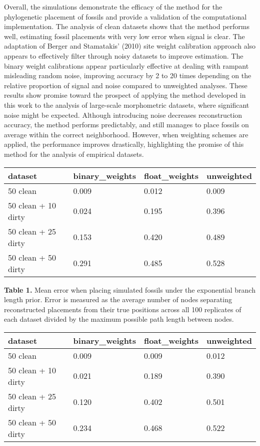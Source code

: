 \documentclass[12pt]{article}
\begin{document}
Overall, the simulations demonstrate the efficacy of the method for the
phylogenetic placement of fossils and provide a validation of the
computational implementation. The analysis of clean datasets shows that
the method performs well, estimating fossil placements with very low
error when signal is clear. The adaptation of Berger and Stamatakis'
(2010) site weight calibration approach also appears to effectively
filter through noisy datasets to improve estimation. The binary weight
calibrations appear particularly effective at dealing with rampant
misleading random noise, improving accuracy by 2 to 20 times
depending on the relative proportion of signal and noise compared to
unweighted analyses. These results show promise toward the prospect of
applying the method developed in this work to the analysis of
large-scale morphometric datasets, where significant noise might be
expected. Although introducing noise decreases
reconstruction accuracy, the method performs predictably, and still
manages to place fossils on average within the correct neighborhood.
However, when weighting schemes are applied, the performance improves
drastically, highlighting the promise of this method for the analysis of
empirical datasets.

\begin{longtable}[]{@{}llll@{}}
\toprule
dataset & binary\_weights & float\_weights & unweighted\tabularnewline
\midrule
\endhead
50 clean & 0.009 & 0.012  & 0.009 \tabularnewline
50 clean + 10 dirty & 0.024  & 0.195  & 0.396 \tabularnewline
50 clean + 25 dirty & 0.153 & 0.420  & 0.489  \tabularnewline
50 clean + 50 dirty & 0.291  & 0.485 & 0.528 \tabularnewline
\bottomrule
\end{longtable}

\textbf{Table 1.} Mean error when placing simulated fossils under the exponential branch length prior. Error is measured as the average number of nodes
separating reconstructed placements from their true positions across all
100 replicates of each dataset divided by the maximum possible path length between nodes.

\begin{longtable}[]{@{}llll@{}}
\toprule
dataset & binary\_weights & float\_weights & unweighted\tabularnewline
\midrule
\endhead
50 clean & 0.009  & 0.009 & 0.012 \tabularnewline
50 clean + 10 dirty & 0.021 & 0.189 & 0.390 \tabularnewline
50 clean + 25 dirty & 0.120 & 0.402 & 0.501 \tabularnewline
50 clean + 50 dirty & 0.234 & 0.468  & 0.522 \tabularnewline
\bottomrule
\end{longtable}
\end{document}
